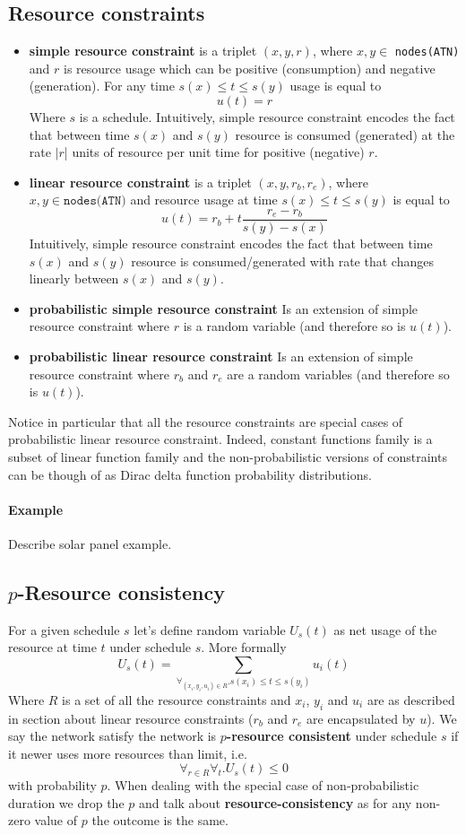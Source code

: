 \documentclass{article}
\begin{document}
\begin{multicols}{2}
\subsection{Resource constraints}
\begin{itemize}
\item \textbf{simple resource constraint} is a triplet $(x, y, r)$, where $x, y \in$ \texttt{nodes(ATN)} and $r$ is resource usage which can be positive (consumption) and negative (generation). For any time $s(x) \leq t \leq s(y)$ usage is equal to
\[
u(t) = r
\]
Where $s$ is a schedule. Intuitively, simple resource constraint encodes the fact that between time $s(x)$ and $s(y)$  resource is consumed (generated) at the rate $|r$| units of resource per unit time for positive (negative) $r$.
\item \textbf{linear resource constraint} is a triplet $(x, y, r_b, r_e)$, where $x, y \in \texttt{nodes(ATN)}$ and resource usage at time $s(x) \leq t \leq s(y)$ is equal to
\[
    u(t) = r_b + t  \frac{r_e - r_b}{s(y) - s(x)}
\]
Intuitively, simple resource constraint encodes the fact that between time $s(x)$ and $s(y)$  resource is consumed/generated with rate that changes linearly between $s(x)$ and $s(y)$.
\item \textbf{probabilistic simple resource constraint}
Is an extension of simple resource constraint where $r$ is a random variable (and therefore so is $u(t)$).
\item \textbf{probabilistic linear resource constraint}
Is an extension of simple resource constraint where $r_b$ and $r_e$ are a random variables (and therefore so is $u(t)$).
\end{itemize}
Notice in particular that all the resource constraints are special cases of probabilistic linear resource constraint. Indeed, constant functions family is a subset of linear function family and the non-probabilistic versions of constraints can be though of as Dirac delta function probability distributions.

\paragraph{Example} Describe solar panel example.


\subsection{$p$-Resource consistency}
For a given schedule $s$ let's define random variable $U_s(t)$ as net usage of the resource at time $t$ under schedule $s$. More formally
\[
U_s(t) = \sum_{\forall_{(x_i,y_i,u_i) \in R}. s(x_i)\leq t \leq s(y_i)} u_i(t)
\]
Where $R$ is a set of all the resource constraints and $x_i$, $y_i$ and $u_i$ are as described in section about linear resource constraints ($r_b$ and $r_e$ are encapsulated by $u$). We say the network satisfy the network is \textbf{$p$-resource consistent} under schedule $s$ if it newer uses more resources than limit, i.e.
\[
\forall_{r \in R} \forall_{t} . U_s(t) \leq 0
\]
with probability $p$. When dealing with the special case of non-probabilistic duration we drop the $p$ and talk about \textbf{resource-consistency} as for any non-zero value of $p$ the outcome is the same.


\end{multicols}
\end{document}
